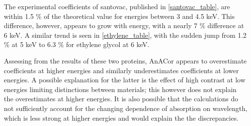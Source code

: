 \begin{table}[h]
\caption{Experimentally calculated ethylene glycol absorption coefficients from AnACor at 50 \% material acceptance. Attenuation length calculated based on chemical formula  and density 1.195 \unit{\gram\per\cubic\cm} on the Center for X-Ray Optics \href{https://henke.lbl.gov/optical_constants/atten2.html}{X-ray Attenuation Length} platform.}
\label{ethylene_table}
\end{table}

The experimental coefficients of santovac, published in \cref{santovac_table}, are within 1.5 \% of the theoretical value for energies between 3 and 4.5 \unit{keV}. This difference, however, appears to grow with energy, with a nearly 7 \% difference at 6 \unit{keV}. A similar trend is seen in \cref{ethylene_table}, with the sudden jump from 1.2 \% at 5 \unit{keV} to 6.3 \% for ethylene glycol at 6 \unit{keV}.

Assessing from the results of these two proteins, AnACor appears to overestimate coefficients at higher energies and similarly underestimates coefficients at lower energies. A possible explanation for the latter is the effect of high contrast at low energies limiting distinctions between materials; this however does not explain the overestimates at higher energies. It is also possible that the calculations do not sufficiently account for the changing dependence of absorption on wavelength, which is less strong at higher energies and would explain the the discrepancies.

